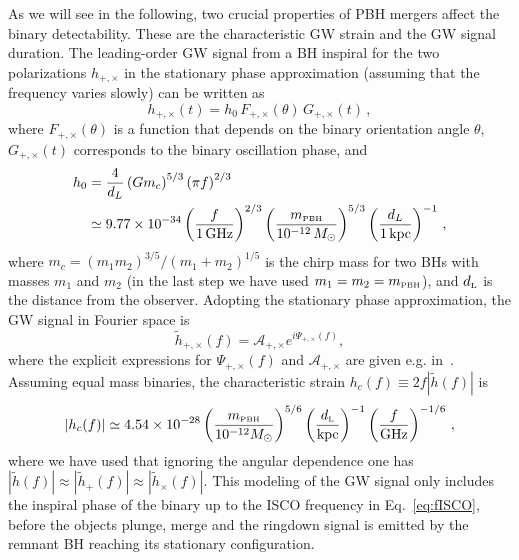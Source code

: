 \documentclass[11pt,a4paper]{article}
\newcommand{\be}{\begin{equation}}
\newcommand{\ee}{\end{equation}}
\newcommand{\lp }{\left (}
\newcommand{\rp }{\right )}
\begin{document}
As we will see in the following, two crucial properties of PBH mergers affect the binary detectability.
These are the characteristic GW strain and the GW signal duration. 
The leading-order GW signal from a BH inspiral for the two polarizations $h_{\scriptscriptstyle{+,\times}}$ in the stationary phase approximation (assuming that the frequency varies slowly) can be written as \cite{Maggiore:1900zz}
\begin{equation}
h_{\scriptscriptstyle{+,\times}}(t) = h_0 \, F_{\scriptscriptstyle{+,\times}}(\theta) \, G_{\scriptscriptstyle{+,\times}}(t) \,,
\end{equation}
where $F_{\scriptscriptstyle{+,\times}}(\theta)$ is a function that depends on the binary orientation angle $\theta$, $G_{\scriptscriptstyle{+,\times}}(t)$ corresponds to the binary oscillation phase, and
\begin{align}
\label{eq:GWamplitude}
h_0 &= 
\frac{4}{d_L} 
\left(G m_c \right)^{5/3} 
\left(\pi f \right)^{2/3} 
\nonumber \\
&\simeq 9.77 \times 10^{-34} \left(\frac{f}{1 \, \text{GHz}}\right)^{2/3} \left(\frac{m_\text{\tiny PBH}}{10^{-12} \, M_\odot}\right)^{5/3} \left(\frac{d_L}{1 \, \text{kpc}}\right)^{-1} \,,
\end{align}
where $m_c = {(m_1 m_2)^{3/5}}/{(m_1 + m_2)^{1/5}}$ is the chirp mass for two BHs with masses $m_1$ and $m_2$ (in the last step we have used $m_1 = m_2 = m_\text{\tiny PBH}$), 
and $d_\text{\tiny L}$ is the distance from the observer.
Adopting the stationary phase approximation, the GW signal in Fourier space is~\cite{Sathyaprakash:2009xs}
\be\label{eq:spawaveform}
\tilde{h}_{\scriptscriptstyle{+,\times}}(f) = {\mathcal A}_{\scriptscriptstyle{+,\times}} e^{i \Psi_{\scriptscriptstyle{+,\times}}(f)}, 
\ee
where the explicit expressions for $\Psi_{\scriptscriptstyle{+,\times}}(f)$ and $\mathcal{A}_{\scriptscriptstyle{+,\times}}$ are given e.g. in~\cite{Maggiore:1900zz}. 
Assuming equal mass binaries, the characteristic strain $h_c (f)\equiv 2 f | \tilde h(f) | $ is 
\begin{equation}\label{eq:spawaveform2}
|h_c (f) | \simeq 4.54 \times 10^{-28} \lp \frac{m_\text{\tiny PBH}}{10^{-12} M_\odot }\rp^{5/6} \lp \frac{d_\text{\tiny L}}{\rm kpc} \rp^{-1} \lp \frac{f}{\rm GHz}\rp ^{-1/6} \,,
\end{equation}
where we have used that ignoring the angular dependence one has $|\tilde{h}(f)| \approx |\tilde{h}_{\scriptscriptstyle{+}}(f)| \approx |\tilde{h}_{\scriptscriptstyle{\times}}(f)|$.
This modeling of the GW signal only includes the inspiral phase of the binary up to the ISCO frequency in Eq.~\eqref{eq:fISCO}, before the objects plunge, merge and the ringdown signal is emitted by the remnant BH reaching its stationary configuration. 
\end{document}
